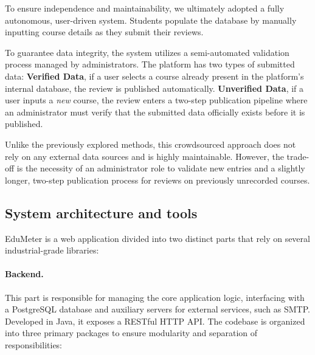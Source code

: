 To ensure independence and maintainability, we ultimately adopted a fully autonomous, user-driven system. Students populate the database by manually inputting course details as they submit their reviews. 

To guarantee data integrity, the system utilizes a semi-automated validation process managed by administrators. The platform has two types of submitted data: \textbf{Verified Data}, if a user selects a course already present in the platform's internal database, the review is published automatically. \textbf{Unverified Data}, if a user inputs a \textit{new} course, the review enters a two-step publication pipeline where an administrator must verify that the submitted data officially exists before it is published.

Unlike the previously explored methods, this crowdsourced approach does not rely on any external data sources and is highly maintainable. However, the trade-off is the necessity of an administrator role to validate new entries and a slightly longer, two-step publication process for reviews on previously unrecorded courses.

\subsection{System architecture and tools}\label{system-architecture-section}

EduMeter is a web application divided into two distinct parts that rely on several industrial-grade libraries:

\paragraph{\textbf{Backend.}}
This part is responsible for managing the core application logic, interfacing with a PostgreSQL database and auxiliary servers for external services, such as SMTP. Developed in Java, it exposes a RESTful HTTP API. The codebase is organized into three primary packages to ensure modularity and separation of responsibilities:

